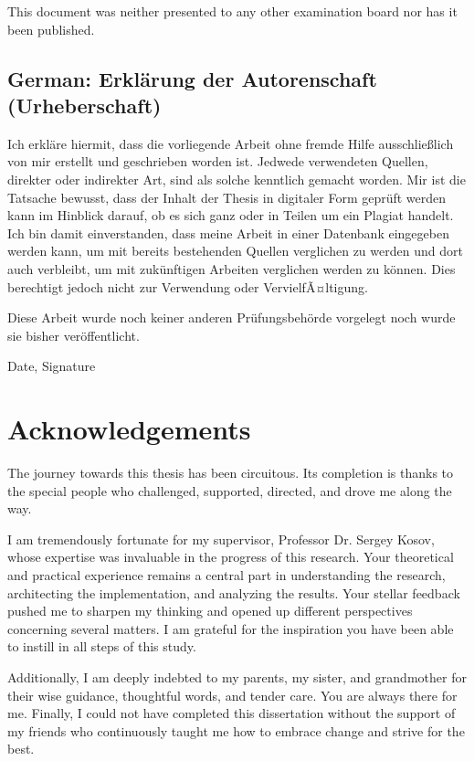 \documentclass[a4paper,11pt,oneside]{article}
\begin{document}
This document was neither presented to any other examination board
nor has it been published.

\subsection*{German: Erklärung der Autorenschaft (Urheberschaft)}
 
Ich erkläre hiermit, dass die vorliegende Arbeit ohne fremde Hilfe
ausschließlich von mir erstellt und geschrieben worden ist. Jedwede
verwendeten Quellen, direkter oder indirekter Art, sind als solche
kenntlich gemacht worden. Mir ist die Tatsache bewusst, dass der
Inhalt der Thesis in digitaler Form geprüft werden kann im Hinblick
darauf, ob es sich ganz oder in Teilen um ein Plagiat handelt. Ich
bin damit einverstanden, dass meine Arbeit in einer Datenbank
eingegeben werden kann, um mit bereits bestehenden Quellen
verglichen zu werden und dort auch verbleibt, um mit zukünftigen
Arbeiten verglichen werden zu können. Dies berechtigt jedoch nicht
zur Verwendung oder VervielfÃ¤ltigung.

Diese Arbeit wurde noch keiner anderen Prüfungsbehörde vorgelegt
noch wurde sie bisher veröffentlicht.

\vspace{20mm}

Date, Signature

\newpage

\section*{Acknowledgements}

The journey towards this thesis has been circuitous. Its completion is thanks to the special people who challenged, supported, directed, and drove me along the way.

I am tremendously fortunate for my supervisor, Professor Dr. Sergey Kosov, whose expertise was invaluable in the progress of this research. Your theoretical and practical experience remains a central part in understanding the research, architecting the implementation, and analyzing the results.  Your stellar feedback pushed me to sharpen my thinking and opened up different perspectives concerning several matters. I am grateful for the inspiration you have been able to instill in all steps of this study.

Additionally, I am deeply indebted to my parents, my sister, and grandmother for their wise guidance, thoughtful words, and tender care. You are always there for me. Finally, I could not have completed this dissertation without the support of my friends who continuously taught me how to embrace change and strive for the best.  
\end{document}
